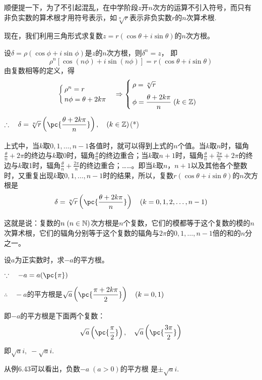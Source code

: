 顺便提一下，为了不引起混乱，在中学阶段$z$开$n$次方的运算不引入符号，而只有非负实数的算术根才用符号表示，如$\sqrt[n]{r}$表示非负实数$r$的$n$次算术根.

现在，我们利用三角形式求复数$z=r(\cos\theta+i\sin\theta)$的$n$次方根。

设$\delta =\rho(\cos\phi+i\sin\phi)$是$z$的$n$次方根，则$\delta^n=z$，
即
\[\rho^n[\cos(n\phi)+i\sin(n\phi)]=r(\cos\theta+i\sin\theta)\]
由复数相等的定义，得
\[\begin{cases}
    \rho^n=r\\
    n\phi=\theta+2k\pi
\end{cases}\Rightarrow \begin{cases}
    \rho=\sqrt[n]{r}\\[1.5ex] \phi=\dfrac{\theta+2k\pi}{n}\; (k\in\mathbb{Z})
\end{cases}\]

$\therefore\quad \delta=\sqrt[n]{r}\left(\pc{\frac{\theta+2k\pi}{n}}\right),\quad (k\in\Z)$\hfill (*)

上式中，当$k$取$0,1,\ldots,n-1$各值时，就可以得到上式的$n$个值。当$k$取$n$时，辐角$\frac{\theta}{n}+2\pi$的终边与$k$取0时，辐角$\frac{\theta}{n}$的终边重合；当$k$取$n+1$时，辐角$\frac{\theta}{n}+\frac{2\pi}{n}+2\pi$的终边与$k$取1时，辐角$\frac{\theta}{n}+\frac{2\pi}{n}$的终边重合；……。即当$k$取$n$，$n+1$以及其他各个整数时，又重复出现$k$取$0,1,\ldots,n-1$时的结果，所以，复数$r(\cos\theta+i\sin\theta)$的$n$次方根是
\[\delta=\sqrt[n]{r}\left(\pc{\frac{\theta+2k\pi}{n}}\right)\quad (k=0,1,2,\ldots,n-1)\]

这就是说：复数的$n\; (n\in\mathbb{N})$次方根是$n$个复数，它们的模都等于这个复数的模的$n$次算术根，它们的辐角分别等于这个复数的辐角与$2\pi$的$0,1,\ldots,n-1$倍的和的$n$分之一。

\begin{example}
    设$a$为正实数时，求$-a$的平方根。
\end{example}

\begin{solution}
$\because\quad -a=a(\pc{\pi})$

$\therefore\quad -a$的平方根是$\sqrt{a}\left(\pc{\frac{\pi+2k\pi}{2}}\right)\quad (k=0,1)$

即$-a$的平方根是下面两个复数：
\[\sqrt{a}\left(\pc{\frac{\pi}{2}}\right),\quad \sqrt{a}\left(\pc{\frac{3\pi}{2}}\right)\]
即$\sqrt{a}i,\; -\sqrt{a}i$.
\end{solution}

\begin{note}
    从例6.43可以看出，负数$-a\; (a>0)$的平方根 是$\pm\sqrt{a}i$.
\end{note}


